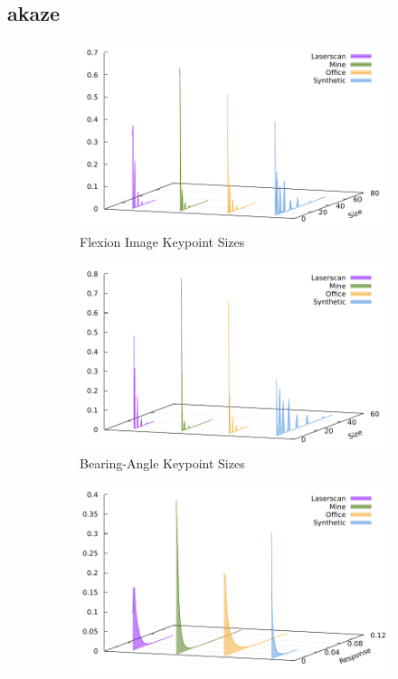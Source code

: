 \subsection{\acrshort{akaze}}
\begin{figure}[H]
\begin{subfigure}[t]{0.45\linewidth}
    \includegraphics[width=\linewidth]{chapter06/results/AKAZE/flexion/size.pdf}%
    \caption{Flexion Image Keypoint Sizes}
\end{subfigure}\quad
\begin{subfigure}[t]{0.45\linewidth}
    \includegraphics[width=\linewidth]{chapter06/results/AKAZE/bearing/size.pdf}
    \caption{Bearing-Angle Keypoint Sizes}
\end{subfigure}
\begin{subfigure}[t]{0.45\linewidth}
    \includegraphics[width=\linewidth]{chapter06/results/AKAZE/flexion/response.pdf}%

\end{subfigure}
\end{figure}
